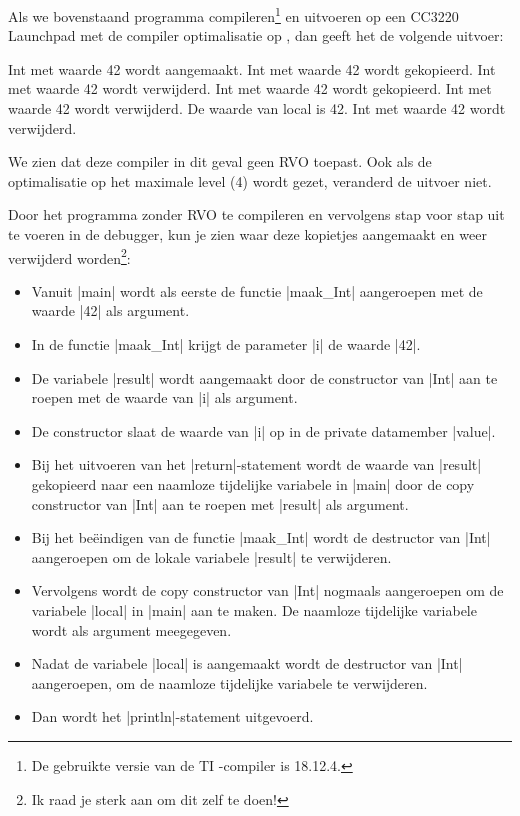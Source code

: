 \begin{cpplstShortInline}
Als we bovenstaand programma compileren\footnote{%
	De gebruikte versie van de TI \Cpp{}\hyp{}compiler is 18.12.4.
} en uitvoeren op een CC3220 Launchpad met de compiler optimalisatie op , dan geeft het de volgende uitvoer:
\begin{coutput}
[Cortex_M4_0] Int met waarde 42 wordt aangemaakt.
Int met waarde 42 wordt gekopieerd.
Int met waarde 42 wordt verwijderd.
Int met waarde 42 wordt gekopieerd.
Int met waarde 42 wordt verwijderd.
De waarde van local is 42.
Int met waarde 42 wordt verwijderd.
\end{coutput}
We zien dat deze compiler in dit geval geen RVO toepast.
Ook als de optimalisatie op het maximale level (4) wordt gezet, veranderd de uitvoer niet.

Door het programma zonder RVO te compileren en vervolgens stap voor stap uit te voeren in de debugger, kun je zien waar deze kopietjes aangemaakt en weer verwijderd worden\footnote{%
	Ik raad je sterk aan om dit zelf te doen!
}:
\begin{itemize}
	\item 
	Vanuit |main| wordt als eerste de functie |maak_Int| aangeroepen met de waarde |42| als argument. 
	\item 
	In de functie |maak_Int| krijgt de parameter |i| de waarde |42|. 
	\item 
	De variabele |result| wordt aangemaakt door de constructor van |Int| aan te roepen met de waarde van |i| als argument.
	\item 
	De constructor slaat de waarde van |i| op in de private datamember |value|.
	\item 
	Bij het uitvoeren van het |return|\hyp{}statement wordt de waarde van |result| gekopieerd naar een naamloze tijdelijke variabele in |main| door de copy constructor van |Int| aan te roepen met |result| als argument.
	\item 
	Bij het beëindigen van de functie |maak_Int| wordt de destructor van |Int| aangeroepen om de lokale variabele |result| te verwijderen.
	\item 
	Vervolgens wordt de copy constructor van |Int| nogmaals aangeroepen om de variabele |local| in |main| aan te maken.
	De naamloze tijdelijke variabele wordt als argument meegegeven.
	\item 
	Nadat de variabele |local| is aangemaakt wordt de destructor van |Int| aangeroepen, om de naamloze tijdelijke variabele te verwijderen.
	\item 
	Dan wordt het |println|\hyp{}statement uitgevoerd.

\end{itemize}
\end{cpplstShortInline}
